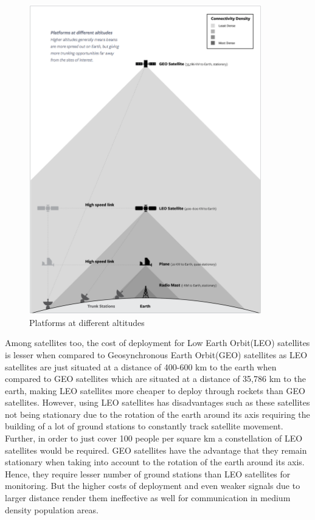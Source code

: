\documentclass{llncs}
\begin{document}
    \begin{figure}[H]
	\centering
	\includegraphics[width=0.9\textwidth]{fig2}
	\caption{Platforms at different altitudes}
	\label{fig:platforms_altitudes}
    \end{figure}
    
    Among satellites too, the cost of deployment for Low Earth Orbit(LEO) satellites is lesser when compared to Geosynchronous Earth 
    Orbit(GEO) satellites as LEO satellites are just situated at a distance of 400-600 km to the earth when compared
     to GEO satellites which are situated at a distance of 35,786 km to the earth, making LEO satellites more cheaper
     to deploy through rockets than GEO satellites. However, using LEO satellites has disadvantages such as these 
     satellites not being stationary due to the rotation of the earth around its axis requiring the building of a lot
     of ground stations to constantly track satellite movement. Further, in order to just cover 100 people per square
     km a constellation of LEO satellites would be required. GEO satellites have the advantage that they remain 
     stationary when taking into account to the rotation of the earth around its axis. Hence, they require lesser 
     number of ground stations than LEO satellites for monitoring. But the higher costs of deployment and even weaker 
     signals due to larger distance render them ineffective as well for communication in medium density population 
     areas. 
     
\end{document}
